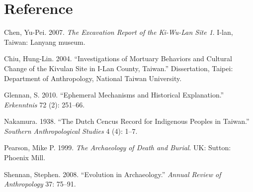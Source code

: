 \documentclass[10pt]{article}
\begin{document}
\section*{Reference}\label{reference}

Chen, Yu-Pei. 2007. \emph{The Excavation Report of the Ki-Wu-Lan Site
1}. I-lan, Taiwan: Lanyang museum.

Chiu, Hung-Lin. 2004. ``Investigations of Mortuary Behaviors and
Cultural Change of the Kivulan Site in I-Lan County, Taiwan.''
Dissertation, Taipei: Department of Anthropology, National Taiwan
University.

Glennan, S. 2010. ``Ephemeral Mechanisms and Historical Explanation.''
\emph{Erkenntnis} 72 (2): 251--66.

Nakamura. 1938. ``The Dutch Cencus Record for Indigenous Peoples in
Taiwan.'' \emph{Southern Anthropological Studies} 4 (4): 1--7.

Pearson, Mike P. 1999. \emph{The Archaeology of Death and Burial}. UK:
Sutton: Phoenix Mill.

Shennan, Stephen. 2008. ``Evolution in Archaeology.'' \emph{Annual
Review of Anthropology} 37: 75--91.
\end{document}
